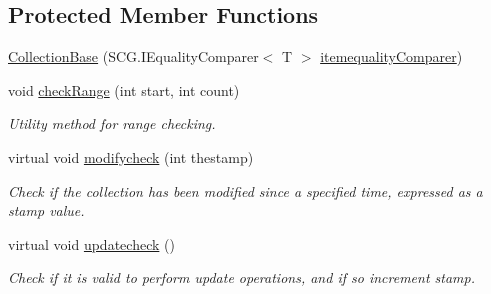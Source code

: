 \subsection*{Protected Member Functions}
\begin{DoxyCompactItemize}
\item 
\hyperlink{class_c5_1_1_collection_base_a30a3c7a3e0ce42c2f768db2788657dc5}{Collection\+Base} (S\+C\+G.\+I\+Equality\+Comparer$<$ T $>$ \hyperlink{class_c5_1_1_collection_base_a95e343400be0e8f3f8d6310f1aaf2cc6}{itemequality\+Comparer})
\item 
void \hyperlink{class_c5_1_1_collection_base_a65fdbed19443252a87929df9550fa126}{check\+Range} (int start, int count)
\begin{DoxyCompactList}\small\item\em Utility method for range checking. \end{DoxyCompactList}\item 
virtual void \hyperlink{class_c5_1_1_collection_base_a526ecabb3f13a4bbaf0ad35625c71666}{modifycheck} (int thestamp)
\begin{DoxyCompactList}\small\item\em Check if the collection has been modified since a specified time, expressed as a stamp value. \end{DoxyCompactList}\item 
virtual void \hyperlink{class_c5_1_1_collection_base_a99366c35ef7e0c9ec293110a54821e3c}{updatecheck} ()
\begin{DoxyCompactList}\small\item\em Check if it is valid to perform update operations, and if so increment stamp. \end{DoxyCompactList}\end{DoxyCompactItemize}
